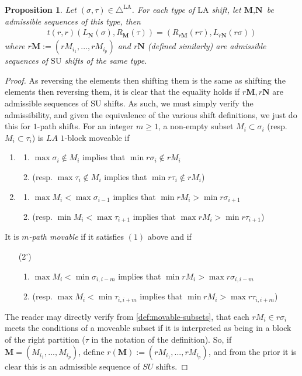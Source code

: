 \documentclass{amsart}
\newtheorem{proposition}[theorem]{Proposition}
\theoremstyle{definition}
\newcommand{\SU}{\mathrm{SU}}
\newcommand{\LA}{\mathrm{LA}}
\newcommand{\LAD}{\triangle^{\mathrm{LA}}}
\begin{document}
\begin{proposition} \label{prop:trr is an isomorphism of shifts}
Let $(\sigma,\tau) \in \LAD$.
For each type of $\LA$ shift, let $\textbf{M},\textbf{N}$ be admissible sequences of this type, then 
\begin{align*}
    t(r,r)(L_\mathbf{N}(\sigma), R_\mathbf{M}(\tau)) = (R_{r\mathbf{M}}(r\tau), L_{r\mathbf{N}}(r\sigma))
\end{align*}
where $r\mathbf{M}:=(rM_{i_1},...,rM_{i_p})$ and $r\mathbf{N}$ (defined similarly) are admissible sequences of $\SU$ shifts of the same type.
\end{proposition}
\begin{proof}
As reversing the elements then shifting them is the same as shifting the elements then reversing them,
it is clear that the equality holds if $r\mathbf{M},r\mathbf{N}$ are admissible sequences of $\SU$ shifts.
As such, we must simply verify the admissibility, and given the equivalence of the various shift definitions, we just do this for $1$-path shifts.
For an integer $m\geq 1$, a non-empty subset $M_i \subset \sigma_i$ (resp. $M_{i}\subset \tau_{i}$) is $LA$ $1$-block moveable if
\begin{enumerate}
    \item 
    \begin{enumerate}
        \item $\max \sigma_i \notin M_i$ implies that $ \min r\sigma_i \not \in r M_i$
        \item (resp. $\max \tau_{i} \notin M_i$ implies that  $ \min r\tau_{i} \not \in r M_i$)
    \end{enumerate}
    \item 
    \begin{enumerate}
        \item $\max M_i < \max \sigma_{i-1}$  implies that $\min r M_i > \min r \sigma_{i+1}$
        \item (resp. $\min M_{i} < \max \tau_{i+1}$ implies that $\max rM_{i} > \min r\tau_{i+1}$)
    \end{enumerate}
\end{enumerate}
It is \emph{$m$-path movable} if it satisfies $(1)$ above and if
\begin{enumerate}
    \item[(2')] 
    \begin{enumerate}
        \item $\max M_i < \min \sigma_{i,i-m}$ implies that $\min r M_i > \max r \sigma_{i,i-m}$
        \item (resp. $\max M_{i} < \min \tau_{i,i+m}$ implies that $\min r M_{i} > \max r\tau_{i,i+m}$)
    \end{enumerate}
\end{enumerate}
The reader may directly verify from \cref{def:movable-subsets}, that each $rM_i \in r\sigma_i$ meets the conditions of a moveable subset 
if it is interpreted as being in a block of the right partition ($\tau$ in the notation of the definition).
So, if $\mathbf{M} = (M_{i_1},...,M_{i_p})$, define $r(\mathbf{M}):=(rM_{i_1},...,rM_{i_p})$, and from the prior it is clear this is an admissible sequence of $SU$ shifts.

\end{proof}
\end{document}
